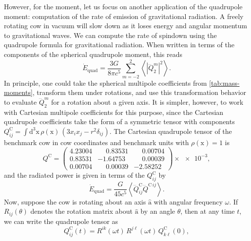 \documentclass[
    prd, twocolumn, nofootinbib, amsmath, amssymb,
    aps, floatfix, preprintnumbers
]{revtex4-2}
\newcommand{\bb}[1]{\bm{\mathrm{#1}}}
\newcommand{\du}{\mathrm{d}}
\begin{document}
However, for the moment, let us focus on another application of the quadrupole moment: computation of the rate of emission of gravitational radiation. A freely rotating cow in vacuum will slow down as it loses energy and angular momentum to gravitational waves. We can compute the rate of spindown using the quadrupole formula for gravitational radiation. When written in terms of the components of the spherical quadrupole moment, this reads
\begin{equation}
    \dot E_{\mathrm{quad}} =
    \frac{3G}{8\pi c^5}\sum_{m=-2}^2
    \left\langle\left|\dddot{Q}_2^m\right|^2\right\rangle
    .
\end{equation}
In principle, one could take the spherical multipole coefficients from \cref{tab:mass-moments}, transform them under rotations, and use this transformation behavior to evaluate $\dddot{Q}_2^m$ for a rotation about a given axis. It is simpler, however, to work with Cartesian multipole coefficients for this purpose, since the Cartesian quadrupole coefficients take the form of a symmetric tensor with components $Q^{\mathrm{C}}_{ij} = \int\du^3\bb x\,\rho(\bb x)\,(3x_ix_j - r^2\delta_{ij})$. The Cartesian quadrupole tensor of the benchmark cow in cow coordinates and benchmark units with $\rho(\bb x) = 1$ is
\begin{equation}
    Q^{\mathrm{C}} =
    \begin{pmatrix}
        4.23004 &  \phantom{-}0.83531 &  \phantom{-}0.00704 \\
        0.83531 & -1.64753 &  \phantom{-}0.00039 \\
        0.00704 &  \phantom{-}0.00039 & -2.58252
    \end{pmatrix}
    \times\num{e-3}
    ,
\end{equation}
and the radiated power is given in terms of the $Q_{ij}^{\mathrm{C}}$ by
\begin{equation}
    \dot E_{\mathrm{quad}} = \frac{G}{45c^5}
        \left\langle\dddot{Q}^{\mathrm{C}}_{ij}\dddot{Q}^{\mathrm{C}\,ij}
        \right\rangle
    .
\end{equation}
Now, suppose the cow is rotating about an axis $\bb{\hat a}$ with angular frequency $\omega$. If $R_{ij}(\theta)$ denotes the rotation matrix about $\bb{\hat a}$ by an angle $\theta$, then at any time $t$, we can write the quadrupole tensor as 
\begin{equation}
    Q_{ij}^{\mathrm{C}}(t) = R^{ik}(\omega t)\,R^{j\ell}(\omega t)\,
        Q_{k\ell}^{\mathrm{C}}(0)
    ,
\end{equation}
\end{document}
